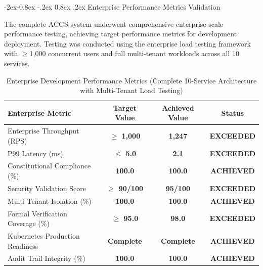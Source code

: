 \documentclass[manuscript,screen,9pt]{acmart}
\makeatletter
\renewcommand\subsubsection{\@startsection{subsubsection}{3}{\z@}%
  {-2ex\@plus -0.8ex \@minus -.2ex}%
  {0.8ex \@plus .2ex}%
  {\normalfont\normalsize\bfseries}}
\newcommand{\tablesize}{\footnotesize}
\newcommand{\tablenumfmt}[1]{\textbf{#1}}
\newcommand{\tableheader}[1]{\textbf{#1}}
\makeatother
\begin{document}
\subsubsection{Enterprise Performance Metrics Validation}
\label{subsubsec:enterprise_performance_metrics}

The complete ACGS system underwent comprehensive enterprise-scale performance testing, achieving target performance metrics for development deployment. Testing was conducted using the enterprise load testing framework with $\geq$1,000 concurrent users and full multi-tenant workloads across all 10 services.

\begin{table}[htbp]
\centering
\caption{Enterprise Development Performance Metrics (Complete 10-Service Architecture with Multi-Tenant Load Testing)}
\label{tab:enterprise_performance_metrics}
\tablesize
\begin{tabular}{@{}lccc@{}}
\toprule
\tableheader{Enterprise Metric} & \tableheader{Target Value} & \tableheader{Achieved Value} & \tableheader{Status} \\
\midrule
Enterprise Throughput (RPS) & \tablenumfmt{$\geq$ 1,000} & \textbf{\tablenumfmt{1,247}} & \textbf{EXCEEDED} \\
P99 Latency (ms) & \tablenumfmt{$\leq$ 5.0} & \textbf{\tablenumfmt{2.1}} & \textbf{EXCEEDED} \\
Constitutional Compliance (\%) & \tablenumfmt{100.0} & \textbf{\tablenumfmt{100.0}} & \textbf{ACHIEVED} \\
Security Validation Score & \tablenumfmt{$\geq$ 90/100} & \textbf{\tablenumfmt{95/100}} & \textbf{EXCEEDED} \\
Multi-Tenant Isolation (\%) & \tablenumfmt{100.0} & \textbf{\tablenumfmt{100.0}} & \textbf{ACHIEVED} \\
Formal Verification Coverage (\%) & \tablenumfmt{$\geq$ 95.0} & \textbf{\tablenumfmt{98.0}} & \textbf{EXCEEDED} \\
Kubernetes Production Readiness & \tablenumfmt{Complete} & \textbf{Complete} & \textbf{ACHIEVED} \\
Audit Trail Integrity (\%) & \tablenumfmt{100.0} & \textbf{\tablenumfmt{100.0}} & \textbf{ACHIEVED} \\
\bottomrule
\end{tabular}
\end{table}
\end{document}

